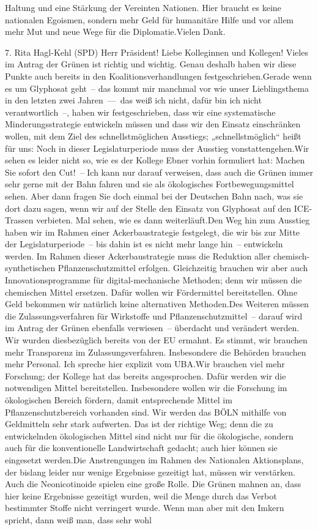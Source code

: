\documentclass{article}
\begin{document}
Haltung und eine Stärkung der Vereinten Nationen. Hier braucht es keine nationalen Egoismen, sondern mehr Geld für humanitäre Hilfe und vor allem mehr Mut und neue Wege für die Diplomatie.Vielen Dank.




	7. Rita Hagl-Kehl (SPD) Herr Präsident! Liebe Kolleginnen und Kollegen! Vieles im Antrag der Grünen ist richtig und wichtig. Genau deshalb haben wir diese Punkte auch bereits in den Koalitionsverhandlungen festgeschrieben.Gerade wenn es um Glyphosat geht – das kommt mir manchmal vor wie unser Lieblingsthema in den letzten zwei Jahren –– das weiß ich nicht, dafür bin ich nicht verantwortlich –, haben wir festgeschrieben, dass wir eine systematische Minderungsstrategie entwickeln müssen und dass wir den Einsatz einschränken wollen, mit dem Ziel des schnellstmöglichen Ausstiegs; „schnellstmöglich“ heißt für uns: Noch in dieser Legislaturperiode muss der Ausstieg vonstattengehen.Wir sehen es leider nicht so, wie es der Kollege Ebner vorhin formuliert hat: Machen Sie sofort den Cut! – Ich kann nur darauf verweisen, dass auch die Grünen immer sehr gerne mit der Bahn fahren und sie als ökologisches Fortbewegungsmittel sehen. Aber dann fragen Sie doch einmal bei der Deutschen Bahn nach, was sie dort dazu sagen, wenn wir auf der Stelle den Einsatz von Glyphosat auf den ICE-Trassen verbieten. Mal sehen, wie es dann weiterläuft.Den Weg hin zum Ausstieg haben wir im Rahmen einer Ackerbaustrategie festgelegt, die wir bis zur Mitte der Legislaturperiode – bis dahin ist es nicht mehr lange hin – entwickeln werden. Im Rahmen dieser Ackerbau­strategie muss die Reduktion aller chemisch-synthetischen Pflanzenschutzmittel erfolgen. Gleichzeitig brauchen wir aber auch Innovationsprogramme für digital-mechanische Methoden; denn wir müssen die chemischen Mittel ersetzen. Dafür wollen wir Fördermittel bereitstellen. Ohne Geld bekommen wir natürlich keine alternativen Methoden.Des Weiteren müssen die Zulassungsverfahren für Wirkstoffe und Pflanzenschutzmittel – darauf wird im Antrag der Grünen ebenfalls verwiesen – überdacht und verändert werden. Wir wurden diesbezüglich bereits von der EU ermahnt. Es stimmt, wir brauchen mehr Transparenz im Zulassungsverfahren. Insbesondere die Behörden brauchen mehr Personal. Ich spreche hier explizit vom UBA.Wir brauchen viel mehr Forschung; der Kollege hat das bereits angesprochen. Dafür werden wir die notwendigen Mittel bereitstellen. Insbesondere wollen wir die Forschung im ökologischen Bereich fördern, damit entsprechende Mittel im Pflanzenschutzbereich vorhanden sind. Wir werden das BÖLN mithilfe von Geldmitteln sehr stark aufwerten. Das ist der richtige Weg; denn die zu entwickelnden ökologischen Mittel sind nicht nur für die ökologische, sondern auch für die konventionelle Landwirtschaft gedacht; auch hier können sie eingesetzt werden.Die Anstrengungen im Rahmen des Nationalen Aktionsplans, der bislang leider nur wenige Ergebnisse gezeitigt hat, müssen wir verstärken. Auch die Neonicotinoide spielen eine große Rolle. Die Grünen mahnen an, dass hier keine Ergebnisse gezeitigt wurden, weil die Menge durch das Verbot bestimmter Stoffe nicht verringert wurde. Wenn man aber mit den Imkern spricht, dann weiß man, dass sehr wohl 
\end{document}
